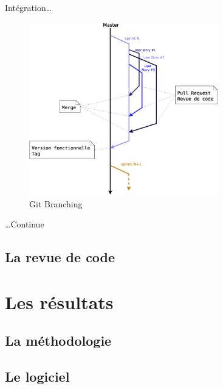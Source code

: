 \documentclass{beamer}
\begin{document}
\begin{frame}{Intégration\ldots}
	\begin{figure}[H]
		\includegraphics[height=7.5cm]{images/BranchingWorkflow.eps}
		\vspace{-10px}
		\caption{Git Branching}
	\end{figure}
\end{frame}

\begin{frame}{\ldots Continue}
\end{frame}
\subsection{La revue de code}
\begin{frame}
	
\end{frame}
\section{Les résultats} %
\subsection{La méthodologie}
\begin{frame}
\end{frame}

\subsection{Le logiciel}
\begin{frame}
\end{frame}
\end{document}
